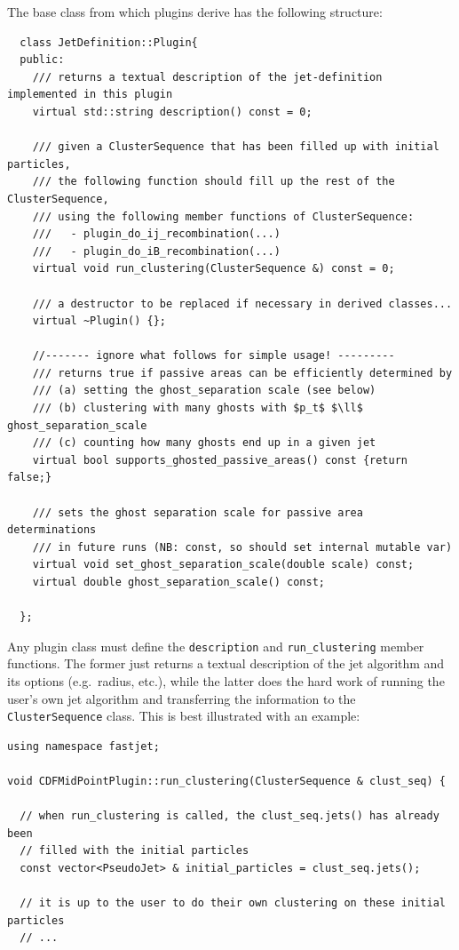 \documentclass[12pt,a4]{article}
\newcommand{\ttt}[1]{{\small\texttt{#1}}}
\begin{document}
%
The base class from which plugins derive has the following structure:
\begin{lstlisting}
  class JetDefinition::Plugin{
  public:
    /// returns a textual description of the jet-definition implemented in this plugin
    virtual std::string description() const = 0;
  
    /// given a ClusterSequence that has been filled up with initial particles, 
    /// the following function should fill up the rest of the ClusterSequence, 
    /// using the following member functions of ClusterSequence:
    ///   - plugin_do_ij_recombination(...)
    ///   - plugin_do_iB_recombination(...)
    virtual void run_clustering(ClusterSequence &) const = 0;
  
    /// a destructor to be replaced if necessary in derived classes...
    virtual ~Plugin() {};

    //------- ignore what follows for simple usage! ---------
    /// returns true if passive areas can be efficiently determined by
    /// (a) setting the ghost_separation scale (see below)
    /// (b) clustering with many ghosts with $p_t$ $\ll$ ghost_separation_scale
    /// (c) counting how many ghosts end up in a given jet
    virtual bool supports_ghosted_passive_areas() const {return false;}

    /// sets the ghost separation scale for passive area determinations
    /// in future runs (NB: const, so should set internal mutable var)
    virtual void set_ghost_separation_scale(double scale) const;
    virtual double ghost_separation_scale() const;

  };
\end{lstlisting}
%
Any plugin class must define the \ttt{description} and
\ttt{run\_clustering} member functions. The former just returns a
textual description of the jet algorithm and its options (e.g.\ radius,
etc.), while the latter does the hard work of running the user's own
jet algorithm and transferring the information to the
\ttt{ClusterSequence} class. This is best illustrated with an example:
\begin{lstlisting}
using namespace fastjet;

void CDFMidPointPlugin::run_clustering(ClusterSequence & clust_seq) {
  
  // when run_clustering is called, the clust_seq.jets() has already been
  // filled with the initial particles
  const vector<PseudoJet> & initial_particles = clust_seq.jets();

  // it is up to the user to do their own clustering on these initial particles
  // ...
\end{lstlisting}
\end{document}
